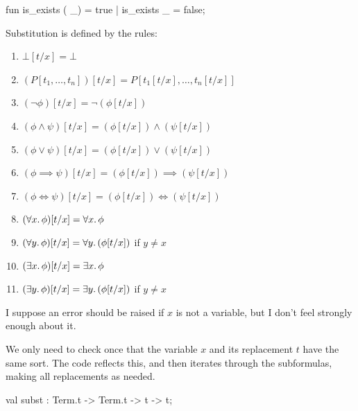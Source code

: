 fun is_exists ( _) = true
  | is_exists _ = false;
\nwendcode{}\nwdocspar

\begin{node}
Substitution is defined by the rules:
\begin{enumerate}
\item $\bot[t/x]=\bot$
\item $(P[t_{1},\dots,t_{n}])[t/x] = P[t_{1}[t/x], \dots, t_{n}[t/x]]$
\item $(\neg\phi)[t/x]=\neg(\phi[t/x])$
\item $(\phi\land\psi)[t/x]=(\phi[t/x])\land(\psi[t/x])$
\item $(\phi\lor\psi)[t/x]=(\phi[t/x])\lor(\psi[t/x])$
\item $(\phi\implies\psi)[t/x]=(\phi[t/x])\implies(\psi[t/x])$
\item $(\phi\iff\psi)[t/x]=(\phi[t/x])\iff(\psi[t/x])$
\item $(\forall x\ldotp\phi)[t/x]=\forall x\ldotp\phi$
\item $(\forall y\ldotp\phi)[t/x]=\forall y\ldotp(\phi[t/x])$ if
  $y\neq x$
\item $(\exists x\ldotp\phi)[t/x]=\exists x\ldotp\phi$
\item $(\exists y\ldotp\phi)[t/x]=\exists y\ldotp(\phi[t/x])$ if
  $y\neq x$
\end{enumerate}
I suppose an error should be raised if $x$ is not a variable, but I
don't feel strongly enough about it.

We only need to check once that the variable $x$ and its replacement
$t$ have the same sort. The code reflects this, and then iterates
through the subformulas, making all replacements as needed.
\end{node}

\nwenddocs{}\plusendmoddef\nwstartdeflinemarkup{}\nwenddeflinemarkup
val subst : Term.t -> Term.t -> t -> t;
\nwendcode{}\nwdocspar

